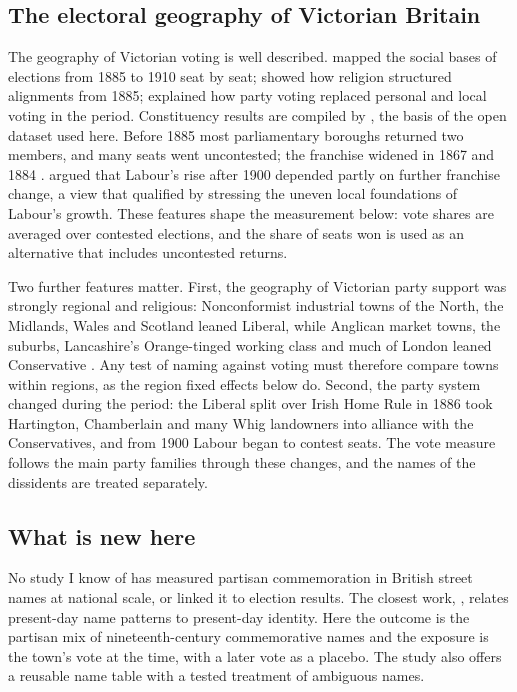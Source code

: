 \documentclass[11pt,a4paper]{article}
\begin{document}
\subsection{The electoral geography of Victorian Britain}
The geography of Victorian voting is well described. \citet{pelling1967} mapped the social bases of elections from 1885 to 1910 seat by seat; \citet{wald1983} showed how religion structured alignments from 1885; \citet{cox1987} explained how party voting replaced personal and local voting in the period. Constituency results are compiled by \citet{craig1989,craig1974}, the basis of the open dataset used here. Before 1885 most parliamentary boroughs returned two members, and many seats went uncontested; the franchise widened in 1867 and 1884 \citep{hanham1959}. \citet{matthew1976} argued that Labour's rise after 1900 depended partly on further franchise change, a view that \citet{tanner1990} qualified by stressing the uneven local foundations of Labour's growth. These features shape the measurement below: vote shares are averaged over contested elections, and the share of seats won is used as an alternative that includes uncontested returns.

Two further features matter. First, the geography of Victorian party support was strongly regional and religious: Nonconformist industrial towns of the North, the Midlands, Wales and Scotland leaned Liberal, while Anglican market towns, the suburbs, Lancashire's Orange-tinged working class and much of London leaned Conservative \citep{pelling1967,wald1983,joyce1980}. Any test of naming against voting must therefore compare towns within regions, as the region fixed effects below do. Second, the party system changed during the period: the Liberal split over Irish Home Rule in 1886 took Hartington, Chamberlain and many Whig landowners into alliance with the Conservatives, and from 1900 Labour began to contest seats. The vote measure follows the main party families through these changes, and the names of the dissidents are treated separately.

\subsection{What is new here}
No study I know of has measured partisan commemoration in British street names at national scale, or linked it to election results. The closest work, \citet{oto2018}, relates present-day name patterns to present-day identity. Here the outcome is the partisan mix of nineteenth-century commemorative names and the exposure is the town's vote at the time, with a later vote as a placebo. The study also offers a reusable name table with a tested treatment of ambiguous names.
\end{document}
